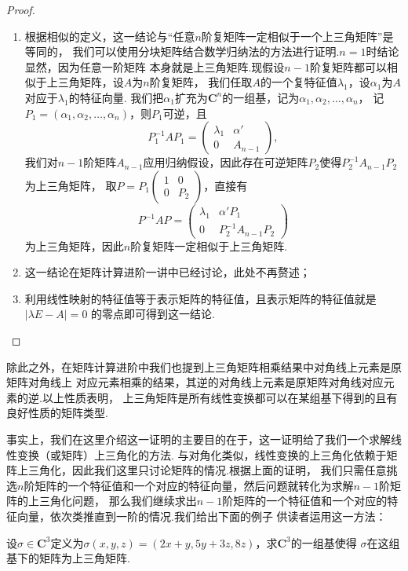 \begin{proof}
    \begin{enumerate}
        \item 根据相似的定义，这一结论与``任意$n$阶复矩阵一定相似于一个上三角矩阵''是等同的，
        我们可以使用分块矩阵结合数学归纳法的方法进行证明.$n=1$时结论显然，因为任意一阶矩阵
        本身就是上三角矩阵.现假设$n-1$阶复矩阵都可以相似于上三角矩阵，设$A$为$n$阶复矩阵，
        我们任取$A$的一个复特征值$\lambda_1$，设$\alpha_1$为$A$对应于$\lambda_1$的特征向量.
        我们把$\alpha_1$扩充为$\mathbf{C}^n$的一组基，记为$\alpha_1,\alpha_2,\ldots,\alpha_n$，
        记$P_1=(\alpha_1,\alpha_2,\ldots,\alpha_n)$，则$P_1$可逆，且
        \[P_1^{-1}AP_1=\begin{pmatrix}
            \lambda_1 & \alpha' \\ 0 & A_{n-1}
        \end{pmatrix},\]
        我们对$n-1$阶矩阵$A_{n-1}$应用归纳假设，因此存在可逆矩阵$P_2$使得$P_2^{-1}A_{n-1}P_2$为上三角矩阵，
        取$P=P_1\begin{pmatrix}
            1 & 0 \\ 0 & P_2
        \end{pmatrix}$，直接有
        \[P^{-1}AP=\begin{pmatrix}
            \lambda_1 & \alpha'P_1 \\ 0 & P_2^{-1}A_{n-1}P_2
        \end{pmatrix}\]
        为上三角矩阵，因此$n$阶复矩阵一定相似于上三角矩阵.
        \item 这一结论在矩阵计算进阶一讲中已经讨论，此处不再赘述；
        \item 利用线性映射的特征值等于表示矩阵的特征值，且表示矩阵的特征值就是$|\lambda E-A|=0$
        的零点即可得到这一结论.
    \end{enumerate}
\end{proof}

除此之外，在矩阵计算进阶中我们也提到上三角矩阵相乘结果中对角线上元素是原矩阵对角线上
对应元素相乘的结果，其逆的对角线上元素是原矩阵对角线对应元素的逆.以上性质表明，
上三角矩阵是所有线性变换都可以在某组基下得到的且有良好性质的矩阵类型.

事实上，我们在这里介绍这一证明的主要目的在于，这一证明给了我们一个求解线性变换（或矩阵）上三角化的方法.
与对角化类似，线性变换的上三角化依赖于矩阵上三角化，因此我们这里只讨论矩阵的情况.根据上面的证明，
我们只需任意挑选$n$阶矩阵的一个特征值和一个对应的特征向量，然后问题就转化为求解$n-1$阶矩阵的上三角化问题，
那么我们继续求出$n-1$阶矩阵的一个特征值和一个对应的特征向量，依次类推直到一阶的情况.我们给出下面的例子
供读者运用这一方法：
\begin{example}
    设$\sigma\in\mathbf{C}^3$定义为$\sigma(x,y,z)=(2x+y,5y+3z,8z)$，求$\mathbf{C}^3$的一组基使得
    $\sigma$在这组基下的矩阵为上三角矩阵.
\end{example}
\begin{solution}

\end{solution}

